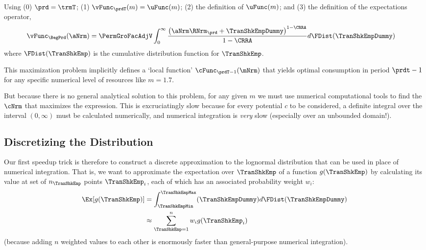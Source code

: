 \documentclass[\econtexRoot/SolvingMicroDSOPs]{subfiles}
\begin{document}
Using (0) $\prd=\trmT$; (1) $\vFunc_{\prdT}(m)=\uFunc(m)$; (2) the definition of $\uFunc(m)$; and (3) the definition of the expectations operator,  %
\begin{equation}\begin{gathered}\begin{aligned}
      \vFunc_{\BegPrd}(\aNrm)   & = \PermGroFacAdjV\int_{0}^{\infty} \frac{\left(\aNrm \RNrm_{\prd}+ \TranShkEmpDummy\right)^{1-\CRRA}}{1-\CRRA}  d\FDist(\TranShkEmpDummy) \label{eq:NumDefInt}
    \end{aligned}\end{gathered}\end{equation}
where $\FDist(\TranShkEmp)$ is the cumulative distribution function for ${\TranShkEmp}$.

\lstset{basicstyle=\ttfamily\footnotesize,breaklines=true,language=Python,frame=single}


This maximization problem implicitly defines a `local function' $\cFunc_{\prdT-1}(\mNrm)$ that yields optimal consumption in period $\prdt-1$ for any specific numerical level of resources like $m=1.7$.%

But because there is no general analytical solution to this problem, for any given $m$ we must use numerical computational tools to find the $\cNrm$ that maximizes the expression.  This is excruciatingly slow because for every potential $c$ to be considered, a definite integral over the interval $(0,\infty)$ must be calculated numerically, and numerical integration is \textit{very} slow (especially over an unbounded domain!).

\hypertarget{discretizing-the-distribution}{}
\subsection{Discretizing the Distribution}
Our first speedup trick is therefore to construct a discrete approximation to the lognormal distribution that can be used in place of numerical integration.  That is, we want to approximate the expectation over $\TranShkEmp$ of a function $g(\TranShkEmp)$ by calculating its value at set of $n_{\TranShkEmp}$ points $\TranShkEmp_{i}$, each of which has an associated probability weight $w_{i}$:
\begin{equation*}\begin{gathered}\begin{aligned}
      \Ex[g(\TranShkEmp)] & = \int_{\TranShkEmpMin}^{\TranShkEmpMax}(\TranShkEmpDummy)d\FDist(\TranShkEmpDummy) \\
      & \approx \sum_{\TranShkEmp = 1}^{n}w_{i}g(\TranShkEmp_{i})
    \end{aligned}\end{gathered}\end{equation*}
(because adding $n$ weighted values to each other is enormously faster than general-purpose numerical integration).
\end{document}
